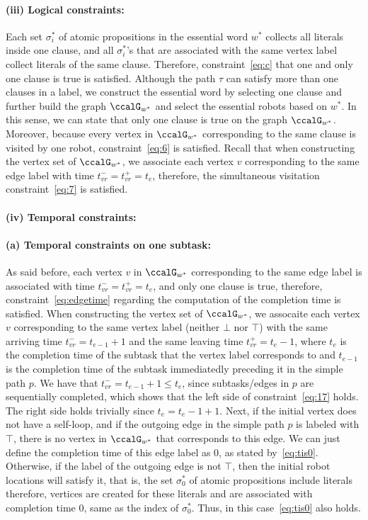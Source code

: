 \documentclass[Afour,sageh,times]{sagej}
\begin{document}
{\paragraph{(iii) Logical constraints:} Each set $\sigma^*_i$ of atomic propositions in the essential word $w^*$ collects all literals inside one clause, and all $\sigma^*_i$'s that are associated with the same vertex label collect literals of the same clause. Therefore, constraint~\eqref{eq:c} that one and only one clause is true is satisfied. Although the path $\tau$ can satisfy more than one clauses in a label, we construct the essential word by selecting one clause and further  build the graph $\ccalG_{w^*}$ and select the essential robots based on $w^*$. In this sense, we can state that only one clause is true on the graph $\ccalG_{w^*}$. Moreover, because every vertex in $\ccalG_{w^*}$ corresponding to the same clause is visited by one robot, constraint~\eqref{eq:6} is satisfied. Recall that when constructing the vertex set of $\ccalG_{w^*}$, we associate each vertex $v$ corresponding to the same edge label with time $t_{vr}^- = t_{vr}^+ = t_e$, therefore, the simultaneous visitation constraint~\eqref{eq:7} is satisfied.

\paragraph{(iv) Temporal constraints:}
\paragraph{(a) Temporal constraints on one subtask:} As said before, each vertex $v$ in $\ccalG_{w^*}$ corresponding to the same edge label is associated with time $t_{vr}^- = t_{vr}^+ = t_e$, and only one clause is true, therefore, constraint~\eqref{eq:edgetime} regarding the computation of the completion time is satisfied. When constructing the vertex set of $\ccalG_{w^*}$, we assocaite each vertex $v$ corresponding to the same vertex label (neither $\bot$ nor $\top$) with the same arriving time $t_{vr}^- = t_{e-1}+1$ and the same leaving time $t_{vr}^+ = t_{e}-1$, where $t_e$ is the completion time of the subtask that the vertex label corresponds to and $t_{e-1}$ is the completion time of the subtask immediatedly preceding it in the simple path $p$. We have that $t_{vr}^- = t_{e-1}+1\leq t_e$, since subtasks/edges in $p$ are sequentially completed, which shows that the left side of constraint~\eqref{eq:17} holds. The right side holds trivially since $t_e = t_e-1+1$. Next, if the initial vertex does not have a self-loop, and if the outgoing edge in the simple path $p$ is labeled with $\top$, there is no vertex in $\ccalG_{w^*}$ that corresponds to this edge. We can just define the completion time of this edge label as 0, as stated by~\eqref{eq:tis0}. Otherwise, if the label of the outgoing edge is not $\top$, then the initial robot locations will satisfy it, that is, the set $\sigma^*_0$ of atomic propositions include literals therefore, vertices are created for these literals and are associated with completion time 0, same as the index of $\sigma_0^*$. Thus, in this case~\eqref{eq:tis0} also holds.

}
\end{document}
